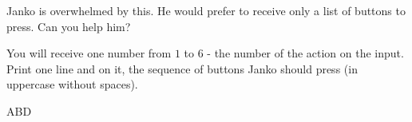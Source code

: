 Janko is overwhelmed by this. He would prefer to receive only a list of buttons to press.
Can you help him?

You will receive one number from $1$ to $6$ - the number of the action on the input. Print one line and on it, the sequence of buttons Janko should press (in uppercase without spaces).

\vystup
ABD
\koniec



